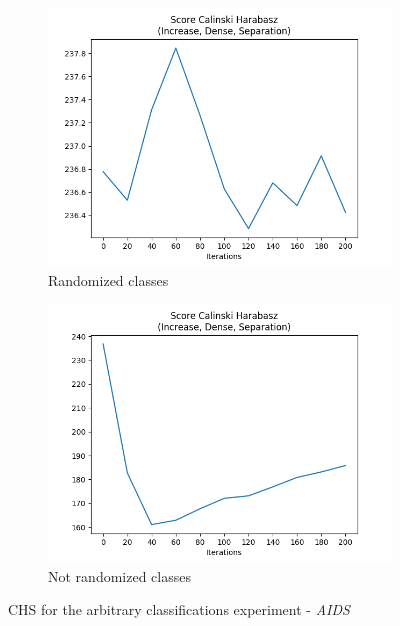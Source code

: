 		\begin{figure}[H]
			\centering
			\begin{subfigure}{0.49\textwidth}
				\centering
				\includegraphics[width=1.1\linewidth]{images/plotE4_CH_E_GDL_09_16h-32m}
				\caption{Randomized classes}
				\label{fig:plote4chegdl0916h-32m}
			\end{subfigure}
			\begin{subfigure}{0.49\textwidth}
				\centering
				\includegraphics[width=1.1\linewidth]{images/plotE4_CH_E_GDL_09_17h-17m}
				\caption{Not randomized classes}
				\label{fig:plote4chegdl0917h-17m}
			\end{subfigure}
			\caption{CHS for the arbitrary classifications experiment - \textit{AIDS}}
			\label{fig:ArbitraryClCH}
		\end{figure}
		
